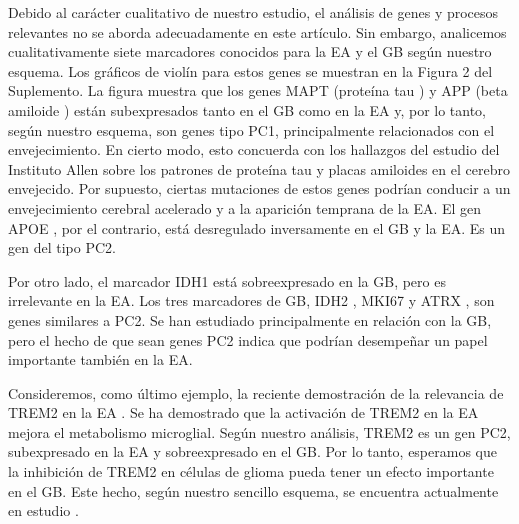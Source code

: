 Debido al carácter cualitativo de nuestro estudio, el análisis de genes y procesos relevantes no se aborda adecuadamente en este artículo. Sin embargo, analicemos cualitativamente siete marcadores conocidos para la EA y el GB según nuestro esquema. Los gráficos de violín para estos genes se muestran en \alert{la Figura 2 del Suplemento}. La figura muestra que los genes MAPT (proteína tau \cite{Strang_2019}) y APP (beta amiloide \cite{TCW_2016}) están subexpresados tanto en el GB como en la EA y, por lo tanto, según nuestro esquema, son genes tipo PC1, principalmente relacionados con el envejecimiento. En cierto modo, esto concuerda con los hallazgos del estudio del Instituto Allen sobre los patrones de proteína tau y placas amiloides en el cerebro envejecido. Por supuesto, ciertas mutaciones de estos genes podrían conducir a un envejecimiento cerebral acelerado y a la aparición temprana de la EA. El gen APOE \cite{Raulin_2022}, por el contrario, está desregulado inversamente en el GB y la EA. Es un gen del tipo PC2.

Por otro lado, el marcador IDH1 \cite{Cohen_2013} está sobreexpresado en la GB, pero es irrelevante en la EA. Los tres marcadores de GB, IDH2 \cite{Cohen_2013}, MKI67 \cite{Chen_2015} y ATRX \cite{Haase_2018}, son genes similares a PC2. Se han estudiado principalmente en relación con la GB, pero el hecho de que sean genes PC2 indica que podrían desempeñar un papel importante también en la EA.

Consideremos, como último ejemplo, la reciente demostración de la relevancia de TREM2 en la EA \cite{van_Lengerich_2023}. Se ha demostrado que la activación de TREM2 en la EA mejora el metabolismo microglial. Según nuestro análisis, TREM2 es un gen PC2, subexpresado en la EA y sobreexpresado en el GB. Por lo tanto, esperamos que la inhibición de TREM2 en células de glioma pueda tener un efecto importante en el GB. Este hecho, según nuestro sencillo esquema, se encuentra actualmente en estudio \cite{Sun_2023}.